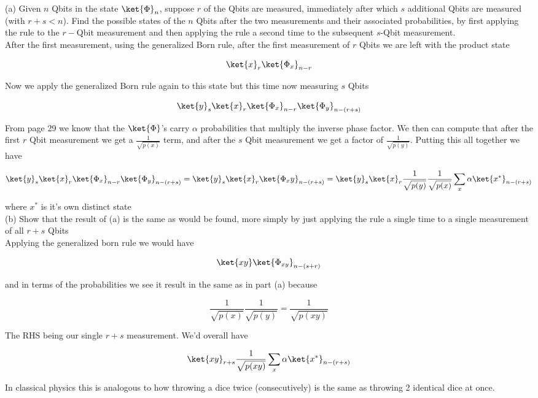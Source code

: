 (a) Given $n$ Qbits in the state $\ket{\Phi}_n$, suppose $r$ of the Qbits are
measured, immediately after which $s$ additional Qbits are measured (with
$r+s<n$). Find the possible states of the $n$ Qbits after the two measurements
and their associated probabilities, by first applying the rule to the $r-$Qbit
measurement and then applying the rule a second time to the subsequent
$s$-Qbit measurement.\\

After the first measurement, using the generalized Born rule, after the first
measurement of $r$ Qbits we are left with the product state

$$\ket{x}_r\ket{\Phi_x}_{n-r}$$

Now we apply the generalized Born rule again to this state but this time now
measuring $s$ Qbits

$$\ket{y}_s\ket{x}_r\ket{\Phi_x}_{n-r}\ket{\Phi_y}_{n-(r+s)}$$

From page 29 we know that the $\ket{\Phi}$'s carry $\alpha$ probabilities that
multiply the inverse phase factor. We then can compute that after the first
$r$ Qbit measurement we get a $\frac{1}{\sqrt{p(x)}}$ term, and after the $s$ Qbit
measurement we get a factor of $\frac{1}{\sqrt{p(y)}}$. Putting this all together we
have

$$\ket{y}_s\ket{x}_r\ket{\Phi_x}_{n-r}\ket{\Phi_y}_{n-(r+s)}=\ket{y}_s\ket{x}_r\ket{\Phi_xy}_{n-(r+s)}=\ket{y}_s\ket{x}_r\frac{1}{\sqrt{p(y)}}\frac{1}{\sqrt{p(x)}}\sum_x\alpha\ket{x^*}_{n-(r+s)}$$

where $x^*$ is it's own distinct state\\

(b) Show that the result of (a) is the same as would be found, more simply by
just applying the rule a single time to a single measurement of all $r+s$
Qbits\\

Applying the generalized born rule we would have

$$\ket{xy}\ket{\Phi_{xy}}_{n-(s+r)}$$

and in terms of the probabilities we see it result in the same as in part (a)
because

$$\frac{1}{\sqrt{p(x)}}\frac{1}{\sqrt{p(y)}}=\frac{1}{\sqrt{p(xy)}}$$

The RHS being our single $r+s$ measurement. We'd overall have

$$\ket{xy}_{r+s}\frac{1}{\sqrt{p(xy)}}\sum_x\alpha\ket{x^*}_{n-(r+s)}$$

In classical physics this is analogous to how throwing a dice twice
(consecutively) is the same as throwing 2 identical dice at once.\\

